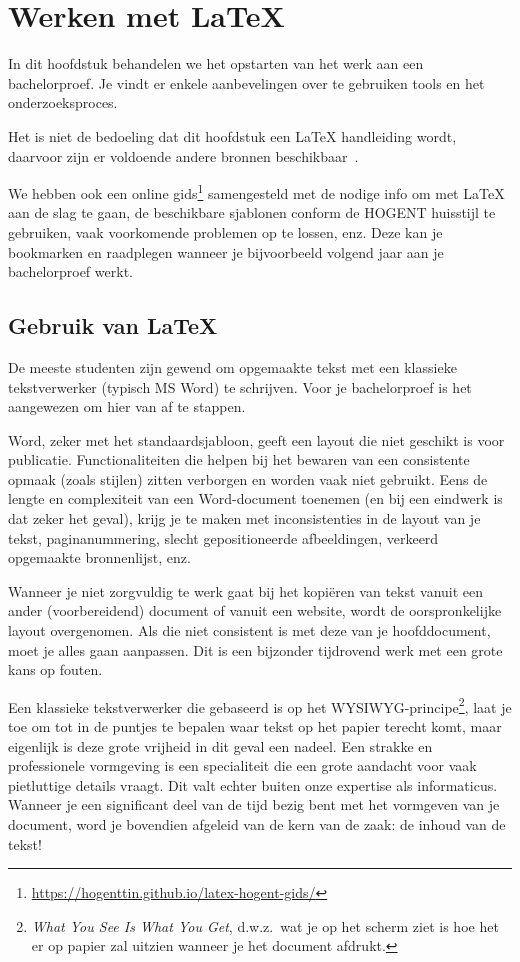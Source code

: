 \chapter{Werken met \LaTeX{}}%
\label{ch:voorbereiding}

In dit hoofdstuk behandelen we het opstarten van het werk aan een bachelorproef. Je vindt er enkele aanbevelingen over te gebruiken tools en het onderzoeksproces.

Het is niet de bedoeling dat dit hoofdstuk een {\LaTeX} handleiding wordt, daarvoor zijn er voldoende andere bronnen beschikbaar~\parencite{Oetiker2015}.

We hebben ook een online gids\footnote{\url{https://hogenttin.github.io/latex-hogent-gids/}} samengesteld met de nodige info om met {\LaTeX} aan de slag te gaan, de beschikbare sjablonen conform de HOGENT huisstijl te gebruiken, vaak voorkomende problemen op te lossen, enz. Deze kan je bookmarken en raadplegen wanneer je bijvoorbeeld volgend jaar aan je bachelorproef werkt.

\section{Gebruik van {\LaTeX}}%
\label{sec:gebruik-van-latex}

De meeste studenten zijn gewend om opgemaakte tekst met een klassieke tekstverwerker (typisch MS Word) te schrijven. Voor je bachelorproef is het aangewezen om hier van af te stappen.

Word, zeker met het standaardsjabloon, geeft een layout die niet geschikt is voor publicatie. Functionaliteiten die helpen bij het bewaren van een consistente opmaak (zoals stijlen) zitten verborgen en worden vaak niet gebruikt. Eens de lengte en complexiteit van een Word-document toenemen (en bij een eindwerk is dat zeker het geval), krijg je te maken met inconsistenties in de layout van je tekst, paginanummering, slecht gepositioneerde afbeeldingen, verkeerd opgemaakte bronnenlijst, enz.

Wanneer je niet zorgvuldig te werk gaat bij het kopiëren van tekst vanuit een ander (voorbereidend) document of vanuit een website, wordt de oorspronkelijke layout overgenomen. Als die niet consistent is met deze van je hoofddocument, moet je alles gaan aanpassen. Dit is een bijzonder tijdrovend werk met een grote kans op fouten.

Een klassieke tekstverwerker die gebaseerd is op het WYSIWYG-principe\footnote{\emph{What You See Is What You Get}, d.w.z.\ wat je op het scherm ziet is hoe het er op papier zal uitzien wanneer je het document afdrukt.}, laat je toe om tot in de puntjes te bepalen waar tekst op het papier terecht komt, maar eigenlijk is deze grote vrijheid in dit geval een nadeel. Een strakke en professionele vormgeving is een specialiteit die een grote aandacht voor vaak pietluttige  details vraagt. Dit valt echter buiten onze expertise als informaticus. Wanneer je een significant deel van de tijd bezig bent met het vormgeven van je document, word je bovendien afgeleid van de kern van de zaak: de inhoud van de tekst!

